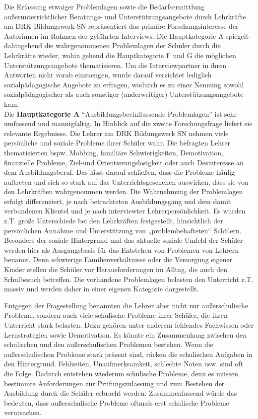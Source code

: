 Die Erfassung etwaiger Problemlagen sowie die Bedarfsermittlung außerunterrichtlicher Beratungs- und Unterstützungsangebote durch Lehrkräfte am DRK Bildungswerk SN repräsentiert das primäre Forschungsinteresse der Autorinnen im Rahmen der geführten Interviews. Die Hauptkategorie A spiegelt dahingehend die wahrgenommenen Problemlagen der Schüler durch die Lehrkräfte wieder, wohin gehend die Hauptkategorie F und G die möglichen Unterstützungsangebote thematisieren. Um die Interviewpartner in ihren Antworten nicht vorab einzuengen, wurde darauf verzichtet lediglich sozialpädagogische Angebote zu erfragen, wodurch es zu einer Nennung sowohl sozialpädagogischer als auch sonstiger (anderweitiger) Unterstützungsangebote kam.\\

\noindent
Die \textbf{Hauptkategorie A} "`Ausbildungsbeeinflussende Problemlagen"' ist sehr umfassend und mannigfaltig. In Hinblick auf die zweite Forschungsfrage liefert sie relevante Ergebnisse. Die Lehrer am DRK Bildungswerk SN nehmen viele persönliche und soziale Probleme ihrer Schüler wahr. Die befragten Lehrer thematisierten bspw. Mobbing, familiäre Schwierigkeiten, Demotivation, finanzielle Probleme, Ziel-und Orientierungslosigkeit oder auch Desinteresse an dem Ausbildungsberuf. Das lässt darauf schließen, dass die Probleme häufig auftreten und sich so stark auf das Unterrichtsgeschehen auswirken, dass sie von den Lehrkräften wahrgenommen werden. Die Wahrnehmung der Problemlagen erfolgt differenziert, je nach betrachteten Ausbildungsgang und dem damit verbundenen Klientel und je nach interviewter Lehrerpersönlichkeit. Es wurden z.T. große Unterschiede bei den Lehrkräften festgestellt, hinsichtlich der persönlichen Annahme und Unterstützung von „problembehafteten“ Schülern. Besonders der soziale Hintergrund und das aktuelle soziale Umfeld der Schüler werden hier als Ausgangsbasis für das Entstehen von Problemen von Lehrern benannt. Denn schwierige Familienverhältnisse oder die Versorgung eigener Kinder stellen die Schüler vor Herausforderungen im Alltag, die auch den Schulbesuch betreffen. Die vorhandene Problemlagen belasten den Unterricht z.T. massiv und werden daher in einer eigenen Kategorie dargestellt.

Entgegen der Fragestellung benannten die Lehrer aber nicht nur außerschulische Probleme, sondern auch viele schulische Probleme ihrer Schüler, die ihren Unterricht stark belasten. Dazu gehören unter anderem fehlendes Fachwissen oder Lernstrategien sowie Demotivation. Es könnte ein Zusammenhang zwischen den schulischen und den außerschulischen Problemen bestehen. Wenn die außerschulischen Probleme stark präsent sind, rücken die schulischen Aufgaben in den Hintergrund. Fehlzeiten, Unaufmerksamkeit, schlechte Noten usw. sind oft die Folge. Dadurch entstehen wiederum schulische Probleme, denn es müssen bestimmte Anforderungen zur Prüfungszulassung und zum Bestehen der Ausbildung durch die Schüler erbracht werden. Zusammenfassend würde das bedeuten, dass außerschulische Probleme oftmals erst schulische Probleme verursachen.\\

